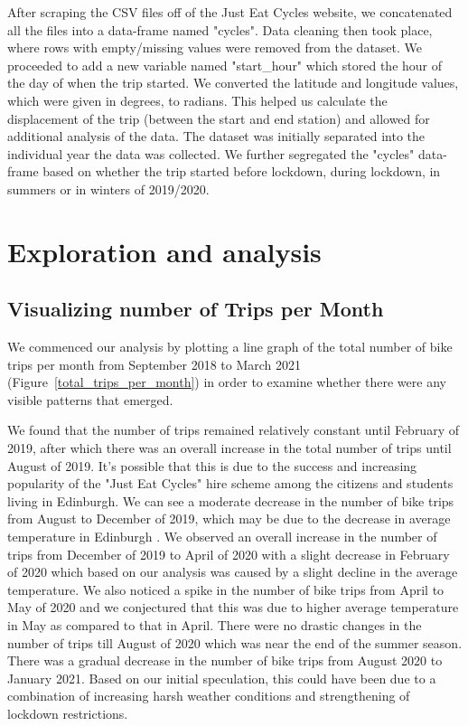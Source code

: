 \documentclass[11pt,a4paper]{article}
\begin{document}
After scraping the CSV files off of the Just Eat Cycles website, we concatenated all the files into a data-frame named "cycles". Data cleaning then took place, where rows with empty/missing values were removed from the dataset. We proceeded to add a new variable named "start\_hour" which stored the hour of the day of when the trip started. We converted the latitude and longitude values, which were given in degrees, to radians. This helped us calculate the displacement of the trip (between the start and end station) and allowed for additional analysis of the data. The dataset was initially separated into the individual year the data was collected. We further segregated the "cycles" data-frame based on whether the trip started before lockdown, during lockdown, in summers or in winters of 2019/2020.

\section{Exploration and  analysis}
\subsection{Visualizing number of Trips per Month}
\vspace{-5mm}
We commenced our analysis by plotting a line graph of the total number of bike trips per month from September 2018 to March 2021 (Figure~\ref{total_trips_per_month}) in order to examine whether there were any visible patterns that emerged.
\par
We found that the number of trips remained relatively constant until February of 2019, after which there was an overall increase in the total number of trips until August of 2019. It's possible that this is due to the success and increasing popularity of the "Just Eat Cycles" hire scheme \cite{hire_scheme} among the citizens and students living in Edinburgh. We can see a moderate decrease in the number of bike trips from August to December of 2019, which may be due to the decrease in average temperature in Edinburgh \cite{average_temp}. We observed an overall increase in the number of trips from December of 2019 to April of 2020 with a slight decrease in February of 2020 which based on our analysis was caused by a slight decline in the average temperature.
We also noticed a spike in the number of bike trips from April to May of 2020 and we conjectured that this was due to higher average temperature in May as compared to that in April. There were no drastic changes in the number of trips till August of 2020 which was near the end of the summer season. There was a gradual decrease in the number of bike trips from August 2020 to January 2021. Based on our initial speculation, this could have been due to a combination of increasing harsh weather conditions and strengthening of lockdown restrictions.
\end{document}
